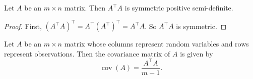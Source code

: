 \begin{lemma}
    Let \(A\) be an \(m \times n\) matrix.
    Then \(A^\top A\) is symmetric positive semi-definite.
\end{lemma}

\begin{proof}
    First, \((A^\top A)^\top = A^\top (A^\top)^\top = A^\top A\).
    So \(A^\top A\) is symmetric.
\end{proof}
\def\cov{\operatorname{cov}}
\begin{definition}
    Let \(A\) be an \(m \times n\) matrix whose columns represent random variables and rows represent observations.
    Then the covariance matrix of \(A\) is given by
    \[\cov(A) = \frac{A^\top A}{m-1}.\]
\end{definition}





    
